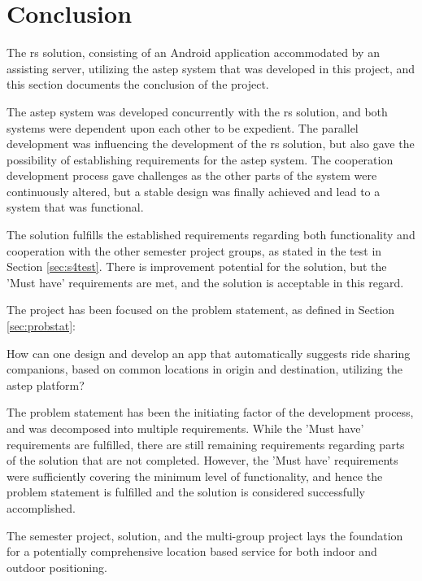 \section{Conclusion}
The \gls{rs} solution, consisting of an Android application accommodated by an assisting server, utilizing the \gls{astep} system that was developed in this project, and this section documents the conclusion of the project.


The \gls{astep} system was developed concurrently with the \gls{rs} solution, and both systems were dependent upon each other to be expedient.
The parallel development was influencing the development of the \gls{rs} solution, but also gave the possibility of establishing requirements for the \gls{astep} system.
The cooperation development process gave challenges as the other parts of the system were continuously altered, but a stable design was finally achieved and lead to a system that was functional.


The solution fulfills the established requirements regarding both functionality and cooperation with the other semester project groups, as stated in the test in Section \ref{sec:s4test}.
There is improvement potential for the solution, but the 'Must have' requirements are met, and the solution is acceptable in this regard.


The project has been focused on the problem statement, as defined in Section \ref{sec:probstat}:

{\addtolength{\leftskip}{10mm}\addtolength{\rightskip}{10mm}\noindent\hrulefill\it
	
	\noindent How can one design and develop an app that automatically suggests ride sharing companions, based on common locations in origin and destination, utilizing the \gls{astep} platform? 
	
	\noindent\hrulefill
	
}

The problem statement has been the initiating factor of the development process, and was decomposed into multiple requirements.
While the 'Must have' requirements are fulfilled, there are still remaining requirements regarding parts of the solution that are not completed.
However, the 'Must have' requirements were sufficiently covering the minimum level of functionality, and hence the problem statement is fulfilled and the solution is considered successfully accomplished.


The semester project, solution, and the multi-group project lays the foundation for a potentially comprehensive location based service for both indoor and outdoor positioning.
